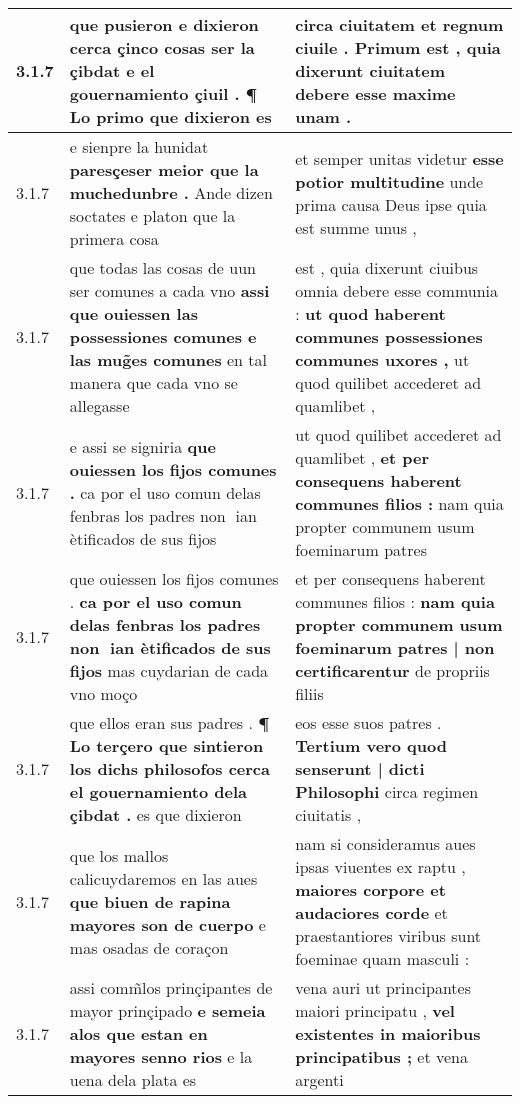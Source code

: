 \begin{tabular}{|p{1cm}|p{6.5cm}|p{6.5cm}|}
3.1.7 & que pusieron e dixieron cerca çinco cosas ser la çibdat \textbf{ e el gouernamiento çiuil . } ¶ Lo primo que dixieron es & circa ciuitatem \textbf{ et regnum ciuile . } Primum est , quia dixerunt ciuitatem debere esse maxime unam . \\\hline
3.1.7 & e sienpre la hunidat \textbf{ paresçeser meior que la muchedunbre . } Ande dizen soctates e platon que la primera cosa & et semper unitas videtur \textbf{ esse potior multitudine } unde prima causa Deus ipse quia est summe unus , \\\hline
3.1.7 & que todas las cosas de uun ser comunes a cada vno \textbf{ assi que ouiessen las possessiones comunes e las mug̃es comunes } en tal manera que cada vno se allegasse & est , quia dixerunt ciuibus omnia debere esse communia : \textbf{ ut quod haberent communes possessiones communes uxores , } ut quod quilibet accederet ad quamlibet , \\\hline
3.1.7 & e assi se signiria \textbf{ que ouiessen los fijos comunes . } ca por el uso comun delas fenbras los padres non ian ètificados de sus fijos & ut quod quilibet accederet ad quamlibet , \textbf{ et per consequens haberent communes filios : } nam quia propter communem usum foeminarum patres \\\hline
3.1.7 & que ouiessen los fijos comunes . \textbf{ ca por el uso comun delas fenbras los padres non ian ètificados de sus fijos } mas cuydarian de cada vno moço & et per consequens haberent communes filios : \textbf{ nam quia propter communem usum foeminarum patres | non certificarentur } de propriis filiis \\\hline
3.1.7 & que ellos eran sus padres . \textbf{ ¶ Lo terçero que sintieron los dichs philosofos cerca el gouernamiento dela çibdat . } es que dixieron & eos esse suos patres . \textbf{ Tertium vero quod senserunt | dicti Philosophi } circa regimen ciuitatis , \\\hline
3.1.7 & que los mallos calicuydaremos en las aues \textbf{ que biuen de rapina mayores son de cuerpo } e mas osadas de coraçon & nam si consideramus aues ipsas viuentes ex raptu , \textbf{ maiores corpore et audaciores corde } et praestantiores viribus sunt foeminae quam masculi : \\\hline
3.1.7 & assi comm̃los prinçipantes de mayor prinçipado \textbf{ e semeia alos que estan en mayores senno rios } e la uena dela plata es & vena auri ut principantes maiori principatu , \textbf{ vel existentes in maioribus principatibus ; } et vena argenti \\\hline

\end{tabular}
